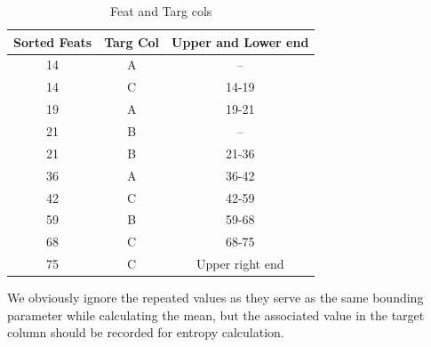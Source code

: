 \documentclass[12pt,letterpaper]{article}
\begin{document}
\begin{table}[H]
    \centering
    \label{Tabular view}
    \begin{tabular}{|c|c|c|}
        \hline
        Sorted Feats & Targ Col & Upper and Lower end\\
        \hline
        14 & A & --\\
        14 & C & 14-19\\
        19 & A & 19-21\\
        21 & B & --\\
        21 & B & 21-36\\
        36 & A & 36-42\\
        42 & C & 42-59\\
        59 & B & 59-68\\
        68 & C & 68-75\\
        75 & C & Upper right end \\
        \hline
    \end{tabular}
    \caption{Feat and Targ cols}
\end{table}
We obviously ignore the repeated values as they serve as the same bounding parameter while calculating the mean, but the associated value in the target column should be recorded for entropy calculation.
\end{document}
